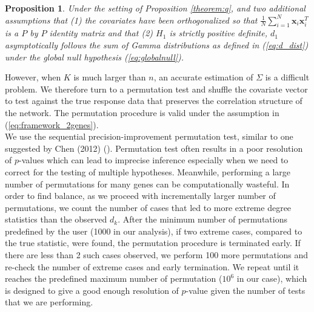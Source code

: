 \documentclass[aap,authoryear, preprint]{imsart}
\numberwithin{equation}{section}
\theoremstyle{plain}
\newtheorem{prop}{Proposition}
\begin{document}
\begin{prop}
Under the setting of Proposition \ref{theorem:q}, and two additional assumptions that (1) the covariates have been orthogonalized so that 
$\frac{1}{N} \sum_{i=1}^{N} \bm{x}_i \bm{x}_i^T$ is a $P$ by $P$ identity matrix and that (2) $H_1$ is strictly positive definite, $d_1$ asymptotically follows the sum of Gamma distributions as defined in (\ref{eq:d_dist}) under the global null hypothesis (\ref{eq:globalnull}). 
\end{prop}

However, when $K$ is much larger than $n$, an accurate estimation of $\Sigma$ is a difficult problem. We therefore turn to a permutation test and shuffle the covariate vector to test against the true response data that preserves the correlation structure of the network. The permutation procedure is valid under the assumption in (\ref{eq:framework_2genes}). \\

We use the sequential precision-improvement permutation test, similar to one suggested by Chen (2012) (\cite{chen2012exponential}). Permutation test often results in a poor resolution of $p$-values which can lead to imprecise inference especially when we need to correct for the testing of multiple hypotheses. Meanwhile, performing a large number of permutations for many genes can be computationally wasteful. In order to find balance, as we proceed with incrementally larger number of permutations, we count the number of cases that led to more extreme degree statistics than the observed $d_k$. After the minimum number of permutations predefined by the user (1000 in our analysis), if two extreme cases, compared to the true statistic, were found, the permutation procedure is terminated early. If there are less than 2 such cases observed, we perform 100 more permutations and re-check the number of extreme cases and early termination. We repeat until it reaches the predefined maximum number of permutation ($10^6$ in our case), which is designed to give a good enough resolution of $p$-value given the number of tests that we are performing. 
\end{document}
